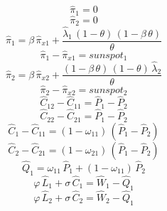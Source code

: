 \begin{dmath}
{{\hat{\pi}_{1}}}=0
\end{dmath}
\begin{dmath}
{{\hat{\pi}_{2}}}=0
\end{dmath}
\begin{dmath}
{{\hat{\pi}_{1}}}={{\beta}}\, {{\hat{\pi}_{x1}}}+\frac{{{\hat{\lambda}_{1}}}\, \left(1-{{\theta}}\right)\, \left(1-{{\beta}}\, {{\theta}}\right)}{{{\theta}}}
\end{dmath}
\begin{dmath}
{{\hat{\pi}_{1}}}-{{\hat{\pi}_{x1}}}={{sunspot_{1}}}
\end{dmath}
\begin{dmath}
{{\hat{\pi}_{2}}}={{\beta}}\, {{\hat{\pi}_{x2}}}+\frac{\left(1-{{\beta}}\, {{\theta}}\right)\, \left(1-{{\theta}}\right)\, {{\hat{\lambda}_{2}}}}{{{\theta}}}
\end{dmath}
\begin{dmath}
{{\hat{\pi}_{2}}}-{{\hat{\pi}_{x2}}}={{sunspot_{2}}}
\end{dmath}
\begin{dmath}
{{\hat{C}_{1 2}}}-{{\hat{C}_{1 1}}}={{\hat{P}_{1}}}-{{\hat{P}_{2}}}
\end{dmath}
\begin{dmath}
{{\hat{C}_{2 2}}}-{{\hat{C}_{2 1}}}={{\hat{P}_{1}}}-{{\hat{P}_{2}}}
\end{dmath}
\begin{dmath}
{{\hat{C}_{1}}}-{{\hat{C}_{1 1}}}=\left(1-{{\omega_{11}}}\right)\, \left({{\hat{P}_{1}}}-{{\hat{P}_{2}}}\right)
\end{dmath}
\begin{dmath}
{{\hat{C}_{2}}}-{{\hat{C}_{2 1}}}=\left(1-{{\omega_{21}}}\right)\, \left({{\hat{P}_{1}}}-{{\hat{P}_{2}}}\right)
\end{dmath}
\begin{dmath}
{{\hat{Q}_{1}}}={{\omega_{11}}}\, {{\hat{P}_{1}}}+\left(1-{{\omega_{11}}}\right)\, {{\hat{P}_{2}}}
\end{dmath}
\begin{dmath}
{{\varphi}}\, {{\hat{L}_{1}}}+{{\sigma}}\, {{\hat{C}_{1}}}={{\hat{W}_{1}}}-{{\hat{Q}_{1}}}
\end{dmath}
\begin{dmath}
{{\varphi}}\, {{\hat{L}_{2}}}+{{\sigma}}\, {{\hat{C}_{2}}}={{\hat{W}_{2}}}-{{\hat{Q}_{1}}}
\end{dmath}
